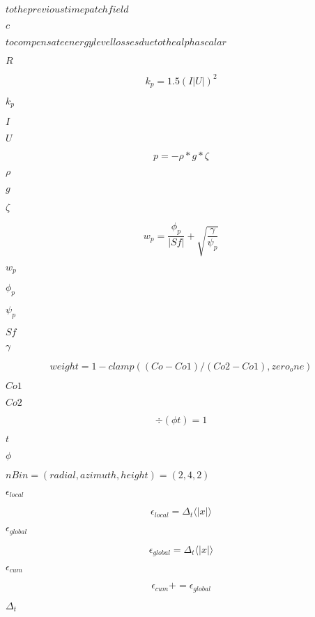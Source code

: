 \documentclass{article}
\begin{document}
$                  to the previous time patch field$
\pagebreak

$        c       $
\pagebreak

$                  to compensate energy level losses due to the alpha scalar$
\pagebreak

$        R       $
\pagebreak

\[
        k_p = 1.5 (I |U|)^2
    \]
\pagebreak

$        k_p     $
\pagebreak

$        I       $
\pagebreak

$        U       $
\pagebreak

\[
        p = -\rho*g*\zeta
    \]
\pagebreak

$        \rho  $
\pagebreak

$        g     $
\pagebreak

$        \zeta $
\pagebreak

\[
        w_p = \frac{\phi_p}{|Sf|} + \sqrt{\frac{\gamma}{\psi_p}}
    \]
\pagebreak

$        w_p     $
\pagebreak

$        \phi_p  $
\pagebreak

$        \psi_p  $
\pagebreak

$        Sf      $
\pagebreak

$        \gamma  $
\pagebreak

\[
    weight = 1 - clamp((Co - Co1)/(Co2 - Co1), zero_one{})
\]
\pagebreak

$        Co1 $
\pagebreak

$        Co2 $
\pagebreak

\[
    \div (\phi t) = 1
\]
\pagebreak

$        t    $
\pagebreak

$        \phi $
\pagebreak

$ nBin = (radial, azimuth, height) = (2, 4, 2) $
\pagebreak

$ \epsilon_{local} $
\pagebreak

\[
    \epsilon_{local} = \Delta_t \langle |x| \rangle
\]
\pagebreak

$ \epsilon_{global} $
\pagebreak

\[
    \epsilon_{global} = \Delta_t \langle |x| \rangle
\]
\pagebreak

$ \epsilon_{cum} $
\pagebreak

\[
    \epsilon_{cum} += \epsilon_{global}
\]
\pagebreak

$      \Delta_t          $
\pagebreak
\end{document}
